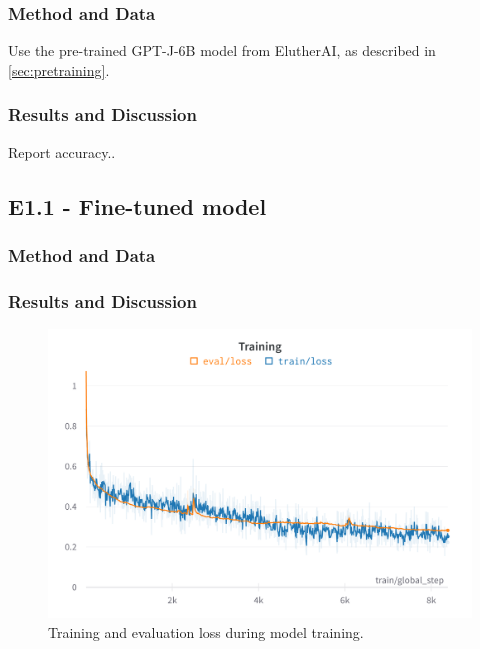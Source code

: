 \subsubsection{Method and Data}
Use the pre-trained GPT-J-6B model from ElutherAI, as described in \cref{sec:pretraining}.

\subsubsection{Results and Discussion}
Report accuracy..

\subsection{E1.1 - Fine-tuned model}
\label{sec:e2.1-fine-tuned-model}

\subsubsection{Method and Data}
\subsubsection{Results and Discussion}


\begin{figure}[htp]
    \centering
    \includegraphics[width=\textwidth]{figures/wandb-train-loss-gpt-j-smart-contract.png}
    \caption{Training and evaluation loss during model training.}
\end{figure}

